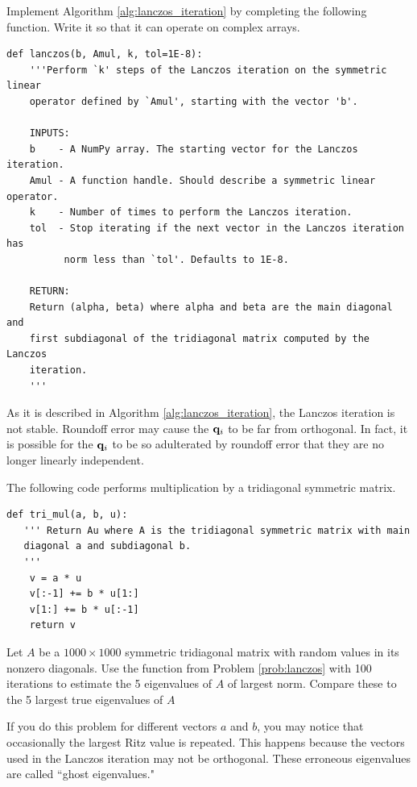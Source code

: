 \begin{problem}
\label{prob:lanczos}
Implement Algorithm \ref{alg:lanczos_iteration} by completing the following function.
Write it so that it can operate on complex arrays.
\begin{lstlisting}
def lanczos(b, Amul, k, tol=1E-8):
    '''Perform `k' steps of the Lanczos iteration on the symmetric linear 
    operator defined by `Amul', starting with the vector 'b'.
    
    INPUTS:
    b    - A NumPy array. The starting vector for the Lanczos iteration.
    Amul - A function handle. Should describe a symmetric linear operator.
    k    - Number of times to perform the Lanczos iteration.
    tol  - Stop iterating if the next vector in the Lanczos iteration has 
          norm less than `tol'. Defaults to 1E-8.
    
    RETURN:
    Return (alpha, beta) where alpha and beta are the main diagonal and 
    first subdiagonal of the tridiagonal matrix computed by the Lanczos 
    iteration.
    '''
\end{lstlisting}
\end{problem}

As it is described in Algorithm \ref{alg:lanczos_iteration}, the Lanczos iteration is not stable.
Roundoff error may cause the ${\bf q}_i$ to be far from orthogonal.
In fact, it is possible for the ${\bf q}_i$ to be so adulterated by roundoff error that they are no longer linearly independent.

\begin{problem}
The following code performs multiplication by a tridiagonal symmetric matrix.

\begin{lstlisting}
def tri_mul(a, b, u):
   ''' Return Au where A is the tridiagonal symmetric matrix with main
   diagonal a and subdiagonal b.
   '''
    v = a * u
    v[:-1] += b * u[1:]
    v[1:] += b * u[:-1]
    return v
\end{lstlisting}

Let $A$ be a $1000\times 1000$ symmetric tridiagonal matrix with random values in its nonzero diagonals.
Use the function  from Problem \ref{prob:lanczos} with 100 iterations to estimate the 5 eigenvalues of $A$ of largest norm.
Compare these to the 5 largest true eigenvalues of $A$

If you do this problem for different vectors $a$ and $b$, you may notice that occasionally the largest Ritz value is repeated.
This happens because the vectors used in the Lanczos iteration may not be orthogonal.
These erroneous eigenvalues are called ``ghost eigenvalues."
\end{problem}

